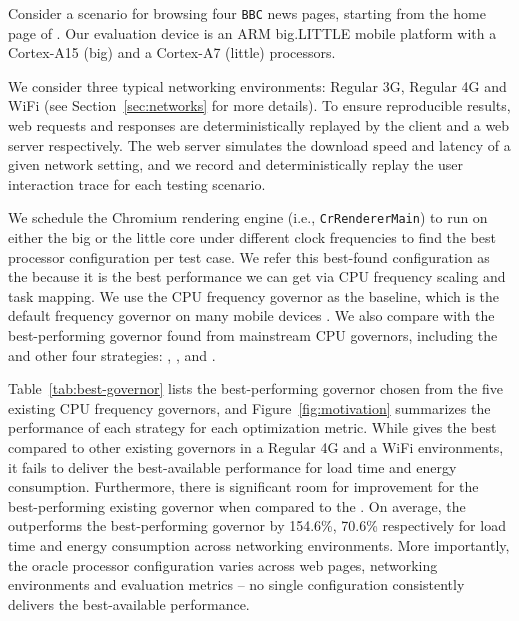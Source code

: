 Consider a scenario for browsing four \texttt{BBC} news pages, starting from the home page of \BBCW. Our evaluation device is an ARM big.LITTLE mobile platform with  a Cortex-A15 (big) and a Cortex-A7 (little)
processors.

\vspace{-1mm}
 We consider three typical networking
environments: Regular 3G, Regular 4G and WiFi (see Section~\ref{sec:networks} for more details). To ensure reproducible results, web requests and responses are deterministically replayed by the client and a web server respectively. The
web server simulates the download speed and latency of a given network setting, and we record and deterministically replay the
user interaction trace for each testing scenario.


\vspace{-1mm}
 We schedule the Chromium rendering engine (i.e., \texttt{CrRendererMain}) to run on either the big or the little
core under different clock frequencies to find the best processor configuration per test case. We refer this best-found configuration as
the \Oracle because it is the best performance we can get via CPU frequency scaling and task mapping. We use the \Interactive CPU
frequency governor as the baseline, which is the default frequency governor on many mobile devices \cite{Seo2015Big}. We also compare with the best-performing governor found from mainstream CPU governors,
including
the \Interactive and other four strategies: \Performance, \Conservative, \Ondemand and \Powersave.



 Table~\ref{tab:best-governor} lists the best-performing governor chosen from the five existing CPU
frequency governors, and Figure~\ref{fig:motivation} summarizes the performance of each strategy for each optimization metric. While
\Interactive  gives the best \EDP compared to other existing governors in a Regular 4G and a WiFi environments, it fails to deliver the
best-available performance for load time and energy consumption. Furthermore, there is significant room for improvement for the best-performing
existing governor when compared to the \Oracle.  On average, the \Oracle outperforms the best-performing governor by 154.6\%,
70.6\% respectively for load time and energy consumption across networking environments. 
More importantly, the oracle processor configuration varies across web pages, networking
environments and evaluation metrics -- no single configuration consistently delivers the best-available performance.



